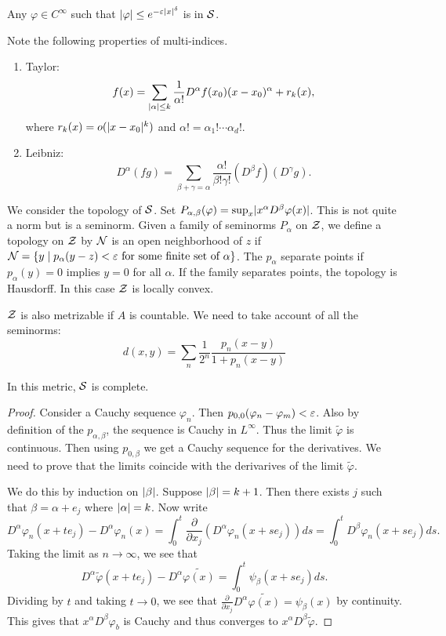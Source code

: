 \documentclass[10pt, twoside]{article}
\begin{document}
    Any $\varphi \in C^{\infty}$ such that $\lvert\varphi\rvert\leq e^{-\varepsilon \lvert x\rvert^{\delta}}$ is in $\mathcal{S}$.

    Note the following properties of multi-indices.
    \begin{enumerate}
        \item Taylor: \[f(x) = \sum_{\lvert\alpha\rvert \leq k} \frac{1}{\alpha !} D^{\alpha} f(x_0)(x-x_0)^{\alpha} + r_k(x), \] where $r_k(x) = o(\lvert x-x_0\rvert^k)$ and $\alpha ! = \alpha_1! \cdots \alpha_d!$.
        \item Leibniz: \[D^{\alpha}(fg) = \sum_{\beta + \gamma = \alpha} \frac{\alpha !}{\beta!\gamma!} (D^{\beta}f)(D^{\gamma}g). \]
    \end{enumerate}

    We consider the topology of $\mathcal{S}$. Set $P_{\alpha, \beta}(\varphi) = \sup_x \lvert x^{\alpha}D^{\beta} \varphi(x)\rvert$. This is not quite a norm but is a seminorm. Given a family of seminorms $P_{\alpha}$ on $\mathcal{Z}$, we define a topology on $\mathcal{Z}$ by $\mathcal{N}$ is an open neighborhood of $z$ if $\mathcal{N} = \{y \mid p_{\alpha}(y-z) < \varepsilon \text{ for some finite set of }\alpha \}$. The $p_{\alpha}$ separate points if $p_{\alpha}(y) = 0$ implies $y = 0$ for all $\alpha$. If the family separates points, the topology is Hausdorff. In this case $\mathcal{Z}$ is locally convex.

    $\mathcal{Z}$ is also metrizable if $A$ is countable. We need to take account of all the seminorms: \[d(x,y) = \sum_n \frac{1}{2^n} \frac{p_n(x-y)}{1+p_n(x-y)} \]

    \begin{thm}
        In this metric, $\mathcal{S}$ is complete.
        \begin{proof}
            Consider a Cauchy sequence $\varphi_n$. Then $p_{0,0}(\varphi_n-\varphi_m) < \varepsilon$. 
            Also by definition of the $p_{\alpha,\beta}$, the sequence is Cauchy in $L^{\infty}$. 
            Thus the limit $\widetilde{\varphi}$ is continuous. Then using $p_{0,\beta}$ we get a Cauchy sequence for the derivatives. We need to prove that the limits coincide with the derivarives of the limit $\widetilde{\varphi}$.

            We do this by induction on $\lvert\beta\rvert$. Suppose $\lvert\beta\rvert = k+1$. Then there exists $j$ such that $\beta = \alpha + e_j$ where $\lvert\alpha\rvert = k$. Now write \[D^{\alpha} \varphi_n(x+te_j) - D^{\alpha} \varphi_n(x) = \int_0^t \frac{\partial}{\partial x_j} \left( D^{\alpha} \varphi_n(x+se_j) \right) ds = \int_0^t D^{\beta} \varphi_n(x+se_j) ds. \] Taking the limit as $n \to \infty$, we see that \[D^{\alpha} \widetilde{\varphi}(x+te_j) - D^{\alpha}\widetilde{\varphi(x)} = \int_0^t \psi_{\beta}(x+se_j)ds.\] Dividing by $t$ and taking $t \to 0$, we see that $\frac{\partial}{\partial x_j} D^{\alpha} \widetilde{\varphi(x)} = \psi_{\beta}(x)$ by continuity. This gives that $x^{\alpha}D^{\beta} \varphi_b$ is Cauchy and thus converges to $x^{\alpha}D^{\beta}\widetilde{\varphi}$.
        \end{proof}
    \end{thm}
\end{document}

